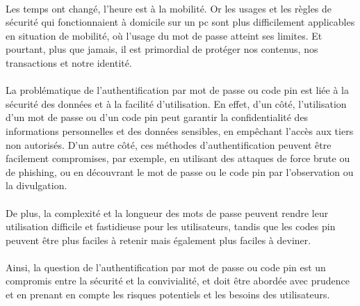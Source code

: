 \introduction

\paragraph{}Les temps ont changé, l’heure est à la mobilité. Or les usages et les règles de sécurité qui fonctionnaient à domicile sur un \acrlong{pc} sont plus difficilement applicables en situation de mobilité, où l’usage du mot de passe atteint ses limites. Et pourtant, plus que jamais, il est primordial de protéger nos contenus, nos transactions et notre identité.
\paragraph{}La problématique de l'authentification par mot de passe ou code pin est liée à la sécurité des données et à la facilité d'utilisation. En effet, d'un côté, l'utilisation d'un mot de passe ou d'un code pin peut garantir la confidentialité des informations personnelles et des données sensibles, en empêchant l'accès aux tiers non autorisés. D'un autre côté, ces méthodes d'authentification peuvent être facilement compromises, par exemple, en utilisant des attaques de force brute ou de phishing, ou en découvrant le mot de passe ou le code pin par l'observation ou la divulgation.
\paragraph{}De plus, la complexité et la longueur des mots de passe peuvent rendre leur utilisation difficile et fastidieuse pour les utilisateurs, tandis que les codes pin peuvent être plus faciles à retenir mais également plus faciles à deviner.
\paragraph{}Ainsi, la question de l'authentification par mot de passe ou code pin est un compromis entre la sécurité et la convivialité, et doit être abordée avec prudence et en prenant en compte les risques potentiels et les besoins des utilisateurs. 
